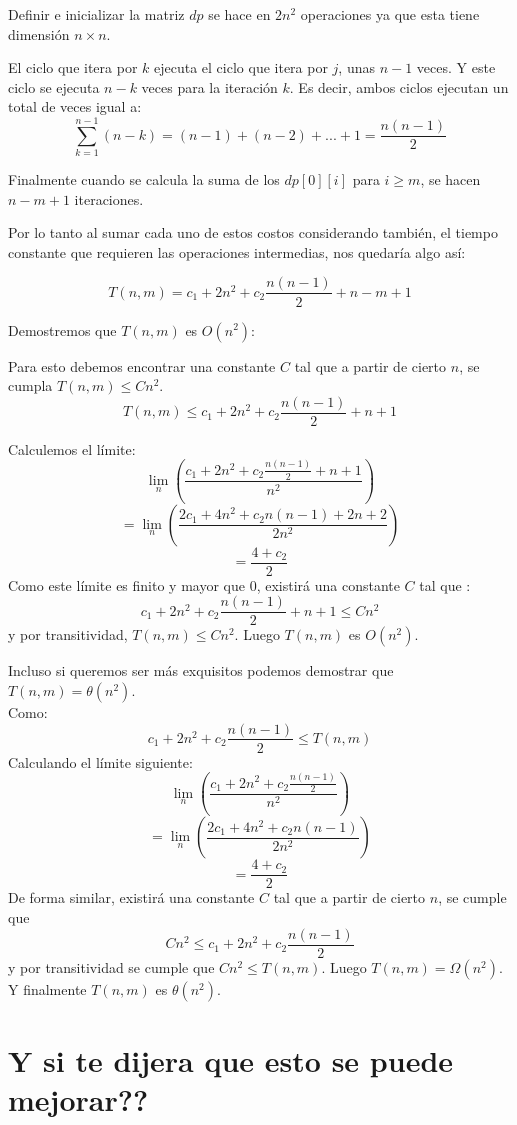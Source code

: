 \documentclass[a4paper]{article}
\begin{document}
	Definir e inicializar la matriz $dp$ se hace en $2n^2$ operaciones ya que esta tiene dimensión $n \times n$.
	
	El ciclo que itera por $k$ ejecuta el ciclo que itera por $j$, unas $n-1$ veces. Y este ciclo se ejecuta $n-k$ veces para la iteración $k$. Es decir, ambos ciclos ejecutan un total de veces igual a:
	$$ \sum_{k=1}^{n-1} (n-k) = (n-1) + (n-2) + ... + 1 = \frac{n(n-1)}{2} $$
	
	Finalmente cuando se calcula la suma de los $dp[0][i]$ para $i \geq m$, se hacen $n-m + 1$ iteraciones.
	
	Por lo tanto al sumar cada uno de estos costos considerando también, el tiempo constante que requieren las operaciones intermedias, nos quedaría algo así:
	
	$$T(n,m) = c_1 + 2n^2 + c_2\frac{n(n-1)}{2} + n-m+1$$
	
	Demostremos que $T(n,m)$ es $O(n^2)$:
	
	Para esto debemos encontrar una constante $C$ tal que a partir de cierto $n$, se cumpla $T(n,m) \leq Cn^2$.
	$$T(n,m) \leq c_1 + 2n^2 + c_2\frac{n(n-1)}{2} + n + 1$$
	
	Calculemos el límite:
	$$ \lim_{n}\left(\frac{c_1 + 2n^2 + c_2\frac{n(n-1)}{2} + n + 1}{n^2}\right)$$
	$$= \lim_{n}\left(\frac{2c_1 + 4n^2 + c_2n(n-1) + 2n + 2}{2n^2}\right)$$
	$$= \frac{4+c_2}{2}$$
	Como este límite es finito y mayor que $0$, existirá una constante $C$ tal que :
	$$ c_1 + 2n^2 + c_2\frac{n(n-1)}{2} + n + 1 \leq Cn^2$$
	y por transitividad, $ T(n,m) \leq Cn^2 $. Luego $T(n,m)$ es $O(n^2)$.
	
	Incluso si queremos ser más exquisitos podemos demostrar que $T(n,m) = \theta(n^2)$. \\
	
	Como:
	$$c_1 + 2n^2 + c_2\frac{n(n-1)}{2} \leq T(n,m)$$
	Calculando el límite siguiente:
	$$ \lim_{n}\left(\frac{c_1 + 2n^2 + c_2\frac{n(n-1)}{2}}{n^2}\right)$$
	$$= \lim_{n}\left(\frac{2c_1 + 4n^2 + c_2n(n-1)}{2n^2}\right)$$
	$$= \frac{4+c_2}{2}$$
	De forma similar, existirá una constante $C$ tal que a partir de cierto $n$, se cumple que 
	$$Cn^2 \leq c_1 + 2n^2 + c_2\frac{n(n-1)}{2}$$
	y por transitividad se cumple que $Cn^2 \leq T(n,m)$. Luego $T(n,m) = \Omega(n^2)$. Y finalmente $T(n,m)$ es $\theta(n^2)$.
	
    \section*{Y si te dijera que esto se puede mejorar??}
\end{document}
